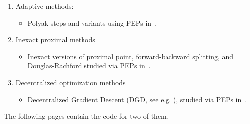 \documentclass[11pt,a4paper]{article}
\begin{document}
\begin{enumerate}
\begin{itemize}
						\end{itemize}
						\item Adaptive methods:
						\begin{itemize}
							\item Polyak steps and variants using PEPs in~\cite{Barre2020Polyak}.
						\end{itemize}
						\item Inexact proximal methods
						\begin{itemize}
							\item Inexact versions of proximal point, forward-backward splitting, and Douglas-Rachford studied via PEPs in~\cite{Barre2020inexact}.
						\end{itemize}
						\item Decentralized optimization methods
						\begin{itemize}
							\item Decentralized Gradient Descent (DGD, see e.g. \cite{Nedic2009Distrib}), studied via PEPs in~\cite{colla2021decentralized}. %
						\end{itemize}
					\end{enumerate}

					The following pages contain the code for two of them.
					\clearpage
\end{document}
